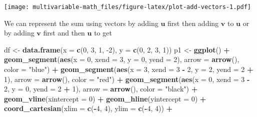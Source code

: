\documentclass[
]{book}
\newenvironment{Shaded}{\begin{snugshade}}{\end{snugshade}}
\newcommand{\DataTypeTok}[1]{\textcolor[rgb]{0.13,0.29,0.53}{#1}}
\newcommand{\DecValTok}[1]{\textcolor[rgb]{0.00,0.00,0.81}{#1}}
\newcommand{\KeywordTok}[1]{\textcolor[rgb]{0.13,0.29,0.53}{\textbf{#1}}}
\newcommand{\NormalTok}[1]{#1}
\newcommand{\OperatorTok}[1]{\textcolor[rgb]{0.81,0.36,0.00}{\textbf{#1}}}
\newcommand{\StringTok}[1]{\textcolor[rgb]{0.31,0.60,0.02}{#1}}
\theoremstyle{definition}
\theoremstyle{definition}
\theoremstyle{definition}
\theoremstyle{definition}
\theoremstyle{remark}
\begin{document}
\texttt{[image: multivariable-math\_files/figure-latex/plot-add-vectors-1.pdf]}

We can represent the sum using vectors by adding \(\mathbf{u}\) first then adding \(\mathbf{v}\) to \(\mathbf{u}\) or by adding \(\mathbf{v}\) first and then \(\mathbf{u}\) to get

\begin{Shaded}
\begin{Highlighting}[]
\NormalTok{df <-}\StringTok{ }\KeywordTok{data.frame}\NormalTok{(}\DataTypeTok{x =} \KeywordTok{c}\NormalTok{(}\DecValTok{0}\NormalTok{, }\DecValTok{3}\NormalTok{, }\DecValTok{1}\NormalTok{, }\DecValTok{-2}\NormalTok{), }\DataTypeTok{y =} \KeywordTok{c}\NormalTok{(}\DecValTok{0}\NormalTok{, }\DecValTok{2}\NormalTok{, }\DecValTok{3}\NormalTok{, }\DecValTok{1}\NormalTok{))}
\NormalTok{p1 <-}\StringTok{ }\KeywordTok{ggplot}\NormalTok{() }\OperatorTok{+}
\StringTok{    }\KeywordTok{geom_segment}\NormalTok{(}\KeywordTok{aes}\NormalTok{(}\DataTypeTok{x =} \DecValTok{0}\NormalTok{, }\DataTypeTok{xend =} \DecValTok{3}\NormalTok{, }\DataTypeTok{y =} \DecValTok{0}\NormalTok{, }\DataTypeTok{yend =} \DecValTok{2}\NormalTok{), }\DataTypeTok{arrow =} \KeywordTok{arrow}\NormalTok{(), }\DataTypeTok{color =} \StringTok{"blue"}\NormalTok{) }\OperatorTok{+}
\StringTok{    }\KeywordTok{geom_segment}\NormalTok{(}\KeywordTok{aes}\NormalTok{(}\DataTypeTok{x =} \DecValTok{3}\NormalTok{, }\DataTypeTok{xend =} \DecValTok{3} \OperatorTok{-}\StringTok{ }\DecValTok{2}\NormalTok{, }\DataTypeTok{y =} \DecValTok{2}\NormalTok{, }\DataTypeTok{yend =} \DecValTok{2} \OperatorTok{+}\StringTok{ }\DecValTok{1}\NormalTok{), }\DataTypeTok{arrow =} \KeywordTok{arrow}\NormalTok{(), }\DataTypeTok{color =} \StringTok{"red"}\NormalTok{) }\OperatorTok{+}
\StringTok{    }\KeywordTok{geom_segment}\NormalTok{(}\KeywordTok{aes}\NormalTok{(}\DataTypeTok{x =} \DecValTok{0}\NormalTok{, }\DataTypeTok{xend =} \DecValTok{3} \OperatorTok{-}\StringTok{ }\DecValTok{2}\NormalTok{, }\DataTypeTok{y =} \DecValTok{0}\NormalTok{, }\DataTypeTok{yend =} \DecValTok{2} \OperatorTok{+}\StringTok{ }\DecValTok{1}\NormalTok{), }\DataTypeTok{arrow =} \KeywordTok{arrow}\NormalTok{(), }\DataTypeTok{color =} \StringTok{"black"}\NormalTok{) }\OperatorTok{+}
\StringTok{    }\KeywordTok{geom_vline}\NormalTok{(}\DataTypeTok{xintercept =} \DecValTok{0}\NormalTok{) }\OperatorTok{+}\StringTok{ }
\StringTok{    }\KeywordTok{geom_hline}\NormalTok{(}\DataTypeTok{yintercept =} \DecValTok{0}\NormalTok{) }\OperatorTok{+}
\StringTok{    }\KeywordTok{coord_cartesian}\NormalTok{(}\DataTypeTok{xlim =} \KeywordTok{c}\NormalTok{(}\OperatorTok{-}\DecValTok{4}\NormalTok{, }\DecValTok{4}\NormalTok{), }\DataTypeTok{ylim =} \KeywordTok{c}\NormalTok{(}\OperatorTok{-}\DecValTok{4}\NormalTok{, }\DecValTok{4}\NormalTok{)) }\OperatorTok{+}\StringTok{ }

\end{Highlighting}
\end{Shaded}
\end{document}
